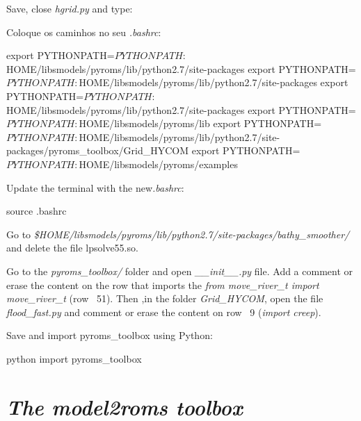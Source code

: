 \noindent Save, close \textit{hgrid.py} and type:
\bigskip

\bigskip

\noindent Coloque os caminhos no seu \textit{.bashrc}:
\bigskip

\begin{bashcode}[fontsize=\scriptsize]
export PYTHONPATH=$PYTHONPATH:$HOME/libsmodels/pyroms/lib/python2.7/site-packages
export PYTHONPATH=$PYTHONPATH:$HOME/libsmodels/pyroms/lib/python2.7/site-packages
export PYTHONPATH=$PYTHONPATH:$HOME/libsmodels/pyroms/lib/python2.7/site-packages
export PYTHONPATH=$PYTHONPATH:$HOME/libsmodels/pyroms/lib
export PYTHONPATH=$PYTHONPATH:$HOME/libsmodels/pyroms/lib/python2.7/site-packages/pyroms_toolbox/Grid_HYCOM
export PYTHONPATH=$PYTHONPATH:$HOME/libsmodels/pyroms/examples
\end{bashcode}
\bigskip

\noindent Update the terminal with the new\textit{.bashrc}:
\bigskip
\begin{bashcode}
source .bashrc
\end{bashcode}
\bigskip

\noindent Go to \textit{\$HOME/libsmodels/pyroms/lib/python2.7/site-packages/bathy\_smoother/} and delete the file lpsolve55.so.
\bigskip

\noindent Go to the \textit{pyroms\_toolbox/} folder and open \textit{\_\_init\_\_.py} file. Add a comment or erase the content
on the row that imports the \textit{from move\_river\_t import move\_river\_t} (row ~51). Then ,in the folder \textit{Grid\_HYCOM},
open the file \textit{flood\_fast.py} and comment or erase the content on row ~9 (\textit{import creep}).
\bigskip

\noindent Save and import pyroms\_toolbox using Python:
\bigskip

\begin{bashcode}
python
import pyroms_toolbox
\end{bashcode}
\bigskip 

\section{\textit{The model2roms toolbox}}\label{model2romssec}
\bigskip

